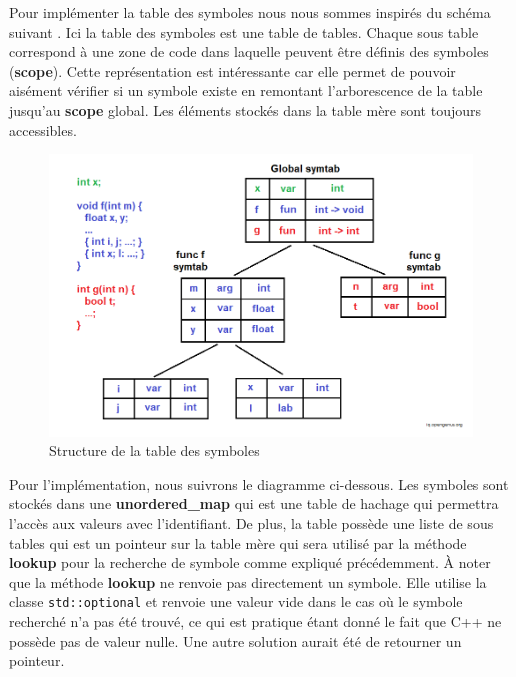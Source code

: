 \documentclass[a4paper]{article}%
\begin{document}
Pour implémenter la table des symboles nous nous sommes inspirés du schéma
suivant \cite{symtableGenius}. Ici la table des symboles est une table de
tables. Chaque sous table correspond à une zone de code dans laquelle peuvent
être définis des symboles (\textbf{scope}). Cette représentation est
intéressante car elle permet de pouvoir aisément vérifier si un symbole existe
en remontant l'arborescence de la table jusqu'au \textbf{scope} global. Les
éléments stockés dans la table mère sont toujours accessibles.
\clearpage

\begin{figure}[h!]
  \begin{center}
  \includegraphics[scale=0.5]{./img/symtable.png}
  \caption{Structure de la table des symboles}
  \end{center}
\end{figure}

Pour l'implémentation, nous suivrons le diagramme ci-dessous. Les symboles sont
stockés dans une \textbf{unordered\_map} qui est une table de hachage qui
permettra l'accès aux valeurs avec l'identifiant. De plus, la table
possède une liste de sous tables qui est un pointeur sur la table mère qui sera
utilisé par la méthode \textbf{lookup} pour la recherche de symbole comme
expliqué précédemment. À noter que la méthode \textbf{lookup} ne renvoie pas
directement un symbole. Elle utilise la classe \lstinline{std::optional} et
renvoie une valeur vide dans le cas où le symbole recherché n'a pas été trouvé,
ce qui est pratique étant donné le fait que C++ ne possède pas de valeur nulle.
Une autre solution aurait été de retourner un pointeur.
\end{document}
